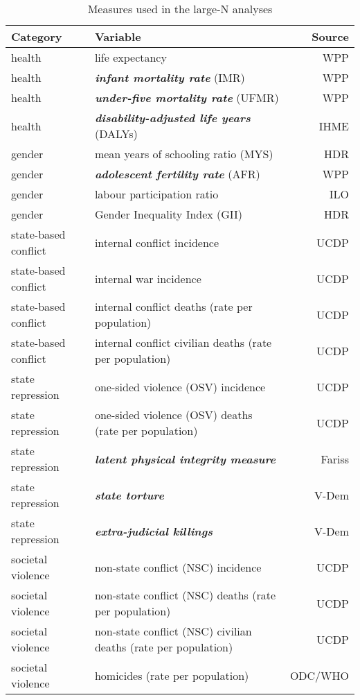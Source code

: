 \begin{table}[!htb]
\centering
\caption{Measures used in the large-N analyses}
\label{table_vars}
\begin{tabular}{llr}
\toprule
Category             & Variable                                                       & Source  \\
\midrule
health               & life expectancy                                                & WPP     \\
health               & \textbf{\textit{infant mortality rate}} (IMR)                  & WPP     \\
health               & \textbf{\textit{under-five mortality rate}} (UFMR)             & WPP     \\
health               & \textbf{\textit{disability-adjusted life years}} (DALYs)       & IHME    \\
gender               & mean years of schooling ratio (MYS)                            & HDR     \\
gender               & \textbf{\textit{adolescent fertility rate}} (AFR)              & WPP     \\
gender               & labour participation ratio                                     & ILO     \\
gender               & Gender Inequality Index (GII)                                  & HDR     \\
state-based conflict & internal conflict incidence                                    & UCDP    \\
state-based conflict & internal war incidence                                         & UCDP    \\
state-based conflict & internal conflict deaths (rate per population)                 & UCDP    \\
state-based conflict & internal conflict civilian deaths (rate per population)        & UCDP    \\
state repression     & one-sided violence (OSV) incidence                             & UCDP    \\
state repression     & one-sided violence (OSV) deaths (rate per population)          & UCDP    \\
state repression     & \textbf{\textit{latent physical integrity measure}}            & Fariss  \\
state repression     & \textbf{\textit{state torture}}                                & V-Dem   \\
state repression     & \textbf{\textit{extra-judicial killings}}                      & V-Dem   \\
societal violence    & non-state conflict (NSC) incidence                             & UCDP    \\
societal violence    & non-state conflict (NSC) deaths (rate per population)          & UCDP    \\
societal violence    & non-state conflict (NSC) civilian deaths (rate per population) & UCDP    \\
societal violence    & homicides (rate per population)                                & ODC/WHO \\
\bottomrule
\end{tabular}
\end{table}
